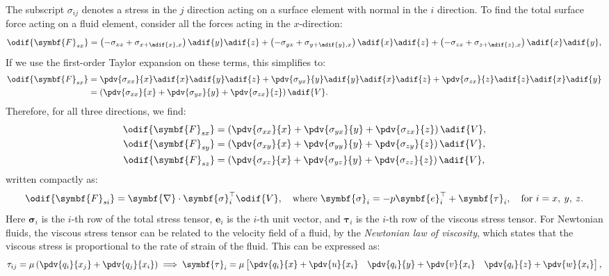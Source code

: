 \documentclass{article}
\theoremstyle{definition}
\begin{document}
The subscript \(\sigma_{ij}\) denotes a stress in the \(j\) direction
acting on a surface element with normal in the \(i\) direction. To find
the total surface force acting on a fluid element, consider all the
forces acting in the \(x\)-direction:
\begin{equation*}
    \odif{\symbf{F}_{sx}} = \left( - \sigma_{xx} + \sigma_{x+\adif{x},x} \right) \adif{y} \adif{z} + \left( - \sigma_{yx} + \sigma_{y+\adif{y},x} \right) \adif{x} \adif{z} + \left( - \sigma_{zx} + \sigma_{z+\adif{z},x} \right) \adif{x} \adif{y},
\end{equation*}
If we use the first-order Taylor expansion on these terms, this
simplifies to:
\begin{align*}
    \odif{\symbf{F}_{sx}} & = \pdv{\sigma_{xx}}{x} \adif{x} \adif{y} \adif{z} + \pdv{\sigma_{yx}}{y} \adif{y} \adif{x} \adif{z} + \pdv{\sigma_{zx}}{z} \adif{z} \adif{x} \adif{y} \\
                          & = \left( \pdv{\sigma_{xx}}{x} + \pdv{\sigma_{yx}}{y} + \pdv{\sigma_{zx}}{z} \right) \adif{V}.
\end{align*}
Therefore, for all three directions, we find:
\begin{align*}
    \odif{\symbf{F}_{sx}} & = \left( \pdv{\sigma_{xx}}{x} + \pdv{\sigma_{yx}}{y} + \pdv{\sigma_{zx}}{z} \right) \adif{V}, \\
    \odif{\symbf{F}_{sy}} & = \left( \pdv{\sigma_{xy}}{x} + \pdv{\sigma_{yy}}{y} + \pdv{\sigma_{zy}}{z} \right) \adif{V}, \\
    \odif{\symbf{F}_{sz}} & = \left( \pdv{\sigma_{xz}}{x} + \pdv{\sigma_{yz}}{y} + \pdv{\sigma_{zz}}{z} \right) \adif{V},
\end{align*}
written compactly as:
\begin{equation*}
    \odif{\symbf{F}_{si}} = \symbf{\nabla} \cdot \symbf{\sigma}_i^\top \odif{V}, \quad \text{where } \symbf{\sigma}_i = -p \symbf{e}_i^\top + \symbf{\tau}_i, \quad \text{for } i = x,\: y,\: z.
\end{equation*}
Here \(\symbf{\sigma}_i\) is the \(i\)-th row of the total stress tensor,
\(\symbf{e}_i\) is the \(i\)-th unit vector, and \(\symbf{\tau}_i\) is
the \(i\)-th row of the viscous stress tensor.
For Newtonian fluids, the viscous stress tensor can be related to the
velocity field of a fluid, by the \textit{Newtonian law of viscosity},
which states that the viscous stress is proportional to the rate of
strain of the fluid. This can be expressed as:
\begin{equation*}
    \tau_{ij} = \mu \left( \pdv{q_i}{x_j} + \pdv{q_j}{x_i} \right) \implies \symbf{\tau}_i = \mu
    \begin{bmatrix}
        \displaystyle \pdv{q_i}{x} + \pdv{u}{x_i} &
        \displaystyle \pdv{q_i}{y} + \pdv{v}{x_i} &
        \displaystyle \pdv{q_i}{z} + \pdv{w}{x_i}
    \end{bmatrix}
    ,
\end{equation*}
\end{document}
